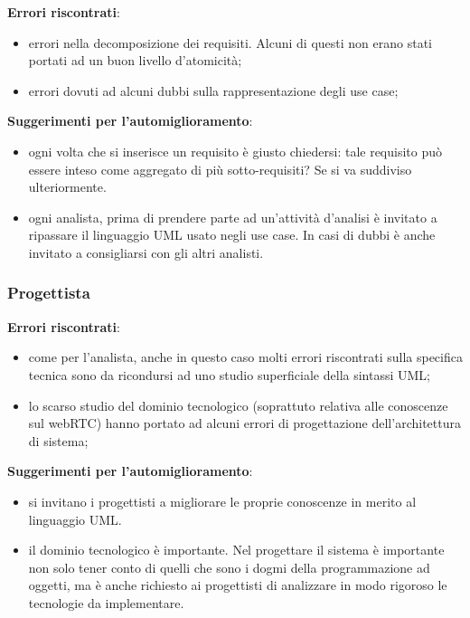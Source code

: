 \begin{description}
	\item \textbf{Errori riscontrati}:
		\begin{itemize}
			\item errori nella decomposizione dei requisiti. Alcuni di questi non erano stati portati ad un buon livello d'atomicità;
			\item errori dovuti ad alcuni dubbi sulla rappresentazione degli use case;
		\end{itemize}
	\item \textbf{Suggerimenti per l'automiglioramento}:
		\begin{itemize}
			\item ogni volta che si inserisce un requisito è giusto chiedersi: tale requisito può essere inteso come aggregato di più sotto-requisiti? Se si va suddiviso ulteriormente.
			\item ogni analista, prima di prendere parte ad un'attività d'analisi è invitato a ripassare il linguaggio UML usato negli use case. In casi di dubbi è anche invitato a consigliarsi con gli altri analisti.
		\end{itemize}
\end{description}

\subsubsection{Progettista}

\begin{description}
	\item \textbf{Errori riscontrati}:
		\begin{itemize}
			\item come per l'analista, anche in questo caso molti errori riscontrati sulla specifica tecnica sono da ricondursi ad uno studio superficiale della sintassi UML;
			\item lo scarso studio del dominio tecnologico (soprattuto relativa alle conoscenze sul webRTC) hanno portato ad alcuni errori di progettazione dell'architettura di sistema;
		\end{itemize}
	\item \textbf{Suggerimenti per l'automiglioramento}:
		\begin{itemize}
			\item si invitano i progettisti a migliorare le proprie conoscenze in merito al linguaggio UML.
			\item il dominio tecnologico è importante. Nel progettare il sistema è importante non solo tener conto di quelli che sono i dogmi della programmazione ad oggetti, ma è anche richiesto ai progettisti di analizzare in modo rigoroso le tecnologie da implementare.
		\end{itemize}
\end{description}

